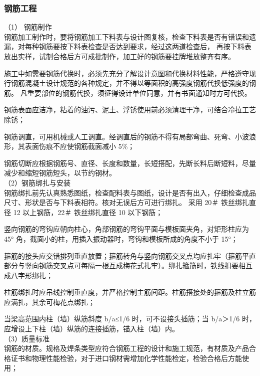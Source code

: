 \subsubsection{钢筋工程}

（1） 钢筋制作\\

钢筋加工制作时，要将钢筋加工下料表与设计图复核，检查下料表是否有错误和遗漏，对每种钢筋要按下料表检查是否达到要求，经过这两道检查后，
再按下料表放出实样，试制合格后方可成批制作，加工好的钢筋要挂牌堆放整齐有序。

施工中如需要钢筋代换时，必须先充分了解设计意图和代换材料性能，严格遵守现行钢筋混凝土设计规范的各种规定，并不得以等面积的高强度钢筋代换低强度的钢筋。
凡重要部位的钢筋代换，须征得设计单位同意，并有书面通知时方可代换。

 钢筋表面应洁净，粘着的油污、泥土、浮锈使用前必须清理干净，可结合冷拉工艺除锈；

 钢筋调直，可用机械或人工调直。经调直后的钢筋不得有局部弯曲、死弯、小波浪形，其表面伤痕不应使钢筋截面减小 5\%；

 钢筋切断应根据钢筋号、直径、长度和数量，长短搭配，先断长料后断短料，尽量减少和缩短钢筋短头，以节约钢材。\\


（2）钢筋绑扎与安装\\

钢筋绑扎前先认真熟悉图纸，检查配料表与图纸，设计是否有出入，仔细检查成品尺寸、形状是否与下料表相符。核对无误后方可进行绑扎。
采用 20＃ 铁丝绑扎直径 12 以上钢筋，22＃ 铁丝绑扎直径 10 以下钢筋；

 竖向钢筋的弯钩应朝向柱心，角部钢筋的弯钩平面与模板面夹角，对矩形柱应为 45° 角，截面小的柱，用插入振动器时，弯钩和模板所成的角度不小于 15°；

 箍筋的接头应交错排列垂直放置；箍筋转角与竖向钢筋交叉点均应扎牢（箍筋平直部分与竖向钢筋交叉点可每隔一根互成梅花式扎牢）。绑扎箍筋时，铁线扣要相互成八字形绑扎；

 柱筋绑扎时应吊线控制垂直度，并严格控制主筋间距。柱筋搭接处的箍筋及柱立筋应满扎，其余可梅花点绑扎；

 当梁高范围内柱（墙）纵筋斜度 b/a≤1/6 时，可不设接头插筋；当 b/a＞1/6 时，应增设上下柱（墙）纵筋的连接插筋，锚入柱（墙）内。 \\

（3）质量标准\\

 钢筋的材质。规格及焊条类型应符合钢筋工程的设计和施工规范，有材质及产品合格证书和物理性能检验，对于进口钢材需增加化学性能检定，检验合格后方能使用；


